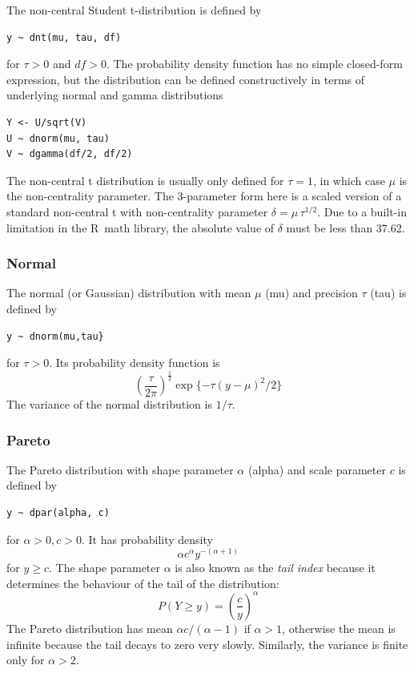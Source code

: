 \documentclass[11pt, a4paper, titlepage]{report}
\newcommand{\R}{\textsf{R}}
\begin{document}
The non-central Student t-distribution is defined by
\begin{verbatim}
y ~ dnt(mu, tau, df)
\end{verbatim}
for $\tau > 0$ and $df > 0$. The probability density function has
no simple closed-form expression, but the distribution can be defined
constructively in terms of underlying normal and gamma distributions
\begin{verbatim}
Y <- U/sqrt(V)
U ~ dnorm(mu, tau)
V ~ dgamma(df/2, df/2)
\end{verbatim}
The non-central t distribution is usually only defined for $\tau = 1$,
in which case $\mu$ is the non-centrality parameter. The 3-parameter
form here is a scaled version of a standard non-central t with
non-centrality parameter $\delta = \mu \, \tau^{1/2}$. Due to a built-in
limitation in the \R\ math library, the absolute value of $\delta$ must
be less than 37.62.

\subsubsection{Normal}
\label{bugs:dnorm}

The normal (or Gaussian) distribution with mean $\mu$ (mu) and precision
$\tau$ (tau) is defined by
\begin{verbatim}
y ~ dnorm(mu,tau}
\end{verbatim}
for $\tau > 0$. Its probability density function is
\[
\left(\frac{\tau}{2\pi}\right)^{\frac{1}{2}} \exp\{- \tau (y - \mu)^2 / 2\}
\]
The variance of the normal distribution is $1/\tau$.


\subsubsection{Pareto}
\label{bugs:pareto}

The Pareto distribution with shape parameter $\alpha$ (alpha) and scale
parameter $c$ is defined by
\begin{verbatim}
y ~ dpar(alpha, c)
\end{verbatim}
for $\alpha > 0, c > 0$. It has probability density
\[
\alpha c^{\alpha} y^{-(\alpha + 1)}
\]
for $y \geq c$. The shape parameter $\alpha$ is also known as the {\em tail
  index} because it determines the behaviour of the tail of the
distribution:
\[
P(Y \geq y) = \left( \frac{c}{y} \right)^\alpha
\]
The Pareto distribution has mean $\alpha c/(\alpha-1)$ if $\alpha >
1$, otherwise the mean is infinite because the tail decays to zero
very slowly. Similarly, the variance is finite only for $\alpha > 2$.
\end{document}
